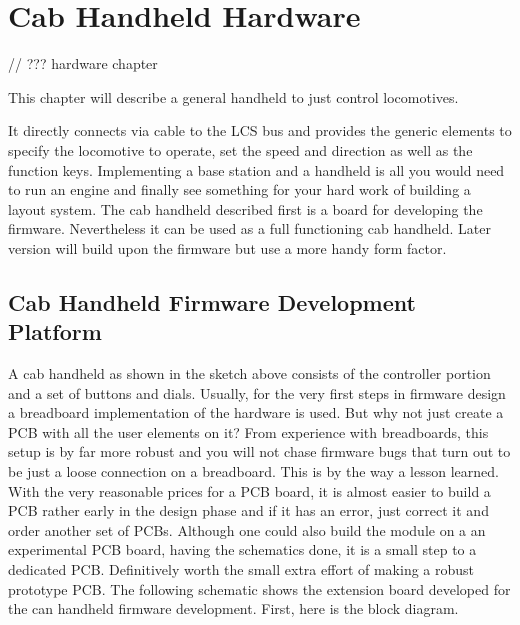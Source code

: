 \chapter{Cab Handheld Hardware}

// ??? hardware chapter 


This chapter will describe a general handheld to just control locomotives. 


It directly connects via cable to the LCS bus and provides the generic elements to specify the locomotive to operate, set the speed and direction as well as the function keys. Implementing a base station and a handheld is all you would need to run an engine and finally see something for your hard work of building a layout system. The cab handheld described first is a board for developing the firmware. Nevertheless it can be used as a full functioning cab handheld. Later version will build upon the firmware but use a more handy form factor.
 

\section{Cab Handheld Firmware Development Platform}

A cab handheld as shown in the sketch above consists of the controller portion and a set of buttons and dials. Usually, for the very first steps in firmware design a breadboard implementation of the hardware is used. But why not just create a PCB with all the user elements on it? From experience with breadboards, this setup is by far more robust and you will not chase firmware bugs that turn out to be just a loose connection on a breadboard. This is by the way a lesson learned. With the very reasonable prices for a PCB board, it is almost easier to build a PCB rather early in the design phase and if it has an error, just correct it and order another set of PCBs. Although one could also build the module on a an experimental PCB board, having the schematics done, it is a small step to a dedicated PCB. Definitively worth the small extra effort of making a robust prototype PCB. The following schematic shows the extension board developed for the can handheld firmware development. First, here is the block diagram.

